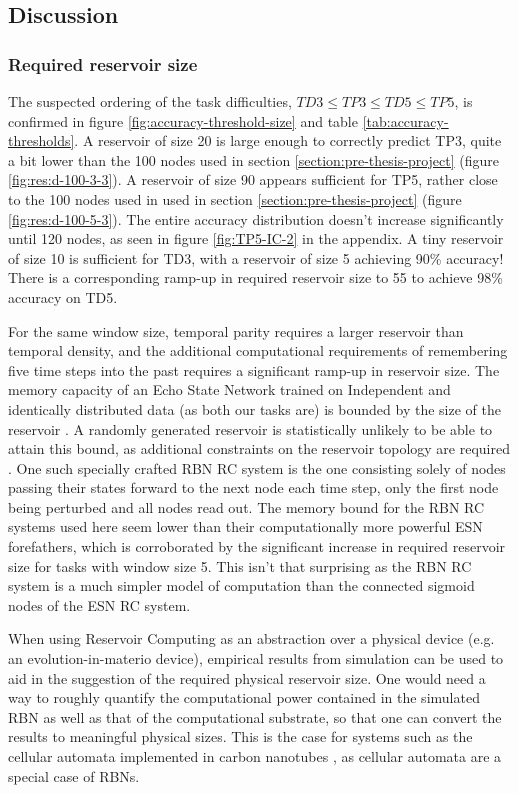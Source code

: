 \subsection{Discussion}

\subsubsection{Required reservoir size}

The suspected ordering of the task difficulties,
$ TD3 \leq TP3 \leq TD5 \leq TP5 $,
is confirmed in figure \ref{fig:accuracy-threshold-size} and table \ref{tab:accuracy-thresholds}.
A reservoir of size 20 is large enough to correctly predict TP3,
quite a bit lower than the 100 nodes used in section \ref{section:pre-thesis-project} (figure \ref{fig:res:d-100-3-3}).
A reservoir of size 90 appears sufficient for TP5, rather close to the 100 nodes used in used in section \ref{section:pre-thesis-project} (figure \ref{fig:res:d-100-5-3}).
The entire accuracy distribution doesn't increase significantly until 120 nodes,
as seen in figure \ref{fig:TP5-IC-2} in the appendix.
A tiny reservoir of size 10 is sufficient for TD3,
with a reservoir of size 5 achieving 90\% accuracy!
There is a corresponding ramp-up in required reservoir size to 55 to achieve 98\% accuracy on TD5.

For the same window size, temporal parity requires a larger reservoir than temporal density,
and the additional computational requirements of remembering five time steps into the past requires a significant ramp-up in reservoir size.
The memory capacity of an Echo State Network trained on Independent and identically distributed data (as both our tasks are) is bounded by the size of the reservoir \cite{Jaeger:2007}.
A randomly generated reservoir is statistically unlikely to be able to attain this bound,
as additional constraints on the reservoir topology are required \cite{Jaeger:2007}.
One such specially crafted RBN RC system is the one consisting solely of nodes passing their states forward to the next node each time step,
only the first node being perturbed and all nodes read out.
The memory bound for the RBN RC systems used here seem lower than their computationally more powerful ESN forefathers,
which is corroborated by the significant increase in required reservoir size for tasks with window size 5.
This isn't that surprising as the RBN RC system is a much simpler model of computation than the connected sigmoid nodes of the ESN RC system.

When using Reservoir Computing as an abstraction over a physical device (e.g. an evolution-in-materio device),
empirical results from simulation can be used to aid in the suggestion of the required physical reservoir size.
One would need a way to roughly quantify the computational power contained in the simulated RBN as well as that of the computational substrate,
so that one can convert the results to meaningful physical sizes.
This is the case for systems such as the cellular automata implemented in carbon nanotubes \cite{farstad2015evolving},
as cellular automata are a special case of RBNs.

